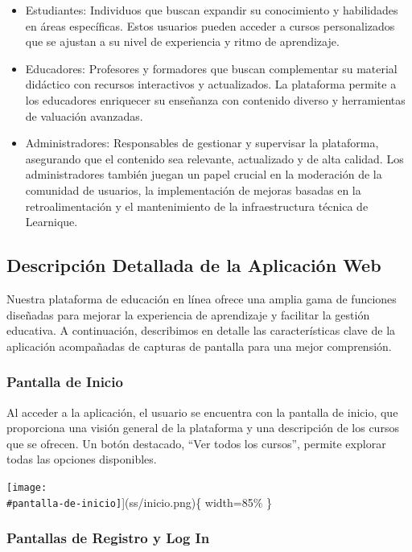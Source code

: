 \documentclass[
]{article}
\begin{document}
\begin{itemize}
\item
  Estudiantes: Individuos que buscan expandir su conocimiento y
  habilidades en áreas específicas. Estos usuarios pueden acceder a
  cursos personalizados que se ajustan a su nivel de experiencia y ritmo
  de aprendizaje.
\item
  Educadores: Profesores y formadores que buscan complementar su
  material didáctico con recursos interactivos y actualizados. La
  plataforma permite a los educadores enriquecer su enseñanza con
  contenido diverso y herramientas de valuación avanzadas.
\item
  Administradores: Responsables de gestionar y supervisar la plataforma,
  asegurando que el contenido sea relevante, actualizado y de alta
  calidad. Los administradores también juegan un papel crucial en la
  moderación de la comunidad de usuarios, la implementación de mejoras
  basadas en la retroalimentación y el mantenimiento de la
  infraestructura técnica de Learnique.
\end{itemize}

\newpage

\subsection{Descripción Detallada de la Aplicación
Web}\label{descripciuxf3n-detallada-de-la-aplicaciuxf3n-web}

Nuestra plataforma de educación en línea ofrece una amplia gama de
funciones diseñadas para mejorar la experiencia de aprendizaje y
facilitar la gestión educativa. A continuación, describimos en detalle
las características clave de la aplicación acompañadas de capturas de
pantalla para una mejor comprensión.

\subsubsection{Pantalla de Inicio}\label{pantalla-de-inicio}

Al acceder a la aplicación, el usuario se encuentra con la pantalla de
inicio, que proporciona una visión general de la plataforma y una
descripción de los cursos que se ofrecen. Un botón destacado, ``Ver
todos los cursos'', permite explorar todas las opciones disponibles.

\texttt{[image: \\\#pantalla-de-inicio]}{]}(ss/inicio.png)\{ width=85\% \}

\subsubsection{Pantallas de Registro y Log
In}\label{pantallas-de-registro-y-log-in}
\end{document}
